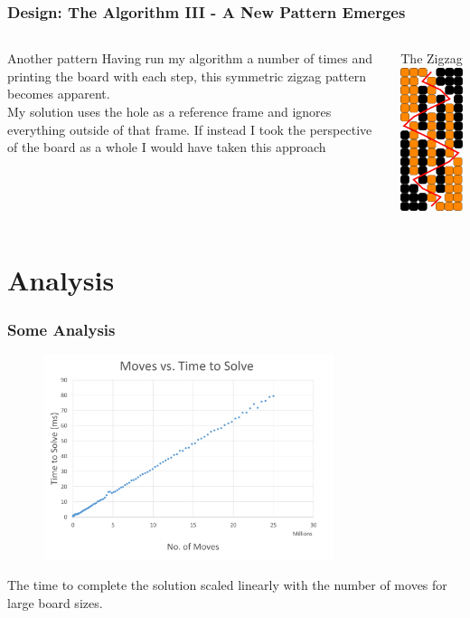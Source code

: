 \documentclass{beamer}
\begin{document}
	\begin{frame}
		\frametitle{Design: The Algorithm III - A New Pattern Emerges}	
		\begin{columns}[T]
			\begin{column}{.5\textwidth}
				\begin{block}{Another pattern}
				Having run my algorithm a number of times and printing the board with each step, 
				this symmetric zigzag pattern becomes apparent. \\\medskip
				My solution uses the hole as a reference frame and ignores everything outside
				of that frame. If instead I took the perspective of the board as a whole I would 
				have taken this approach
				\end{block}
			\end{column}
			
			\begin{column}{.5\textwidth}
				\begin{block}{The Zigzag}
				\includegraphics[width=3cm]{pegboardsolved}
				
				\end{block}
			\end{column}
		\end{columns}
	\end{frame}

\section{Analysis}
	\begin{frame}
		\frametitle{Some Analysis}
					

			\begin{figure}
				\includegraphics[height=6cm]{pegboardtime}
			\end{figure}
			The time to complete the solution scaled linearly with the number of moves for large board sizes.	
			
	\end{frame}
\end{document}
